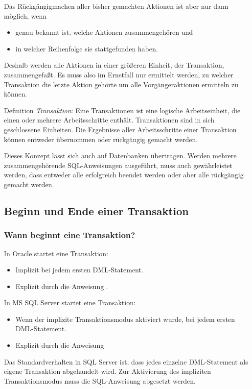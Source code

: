       Das R\"uckg\"angigmachen aller bisher gemachten Aktionen ist aber nur dann
      m\"oglich, wenn
      \begin{itemize}
        \item genau bekannt ist, welche Aktionen zusammengeh\"oren und
        \item  in welcher Reihenfolge sie stattgefunden haben.
      \end{itemize}
      Deshalb werden alle Aktionen in einer gr\"o\ss eren Einheit, der
      Transaktion, zusammengefa\ss t. Es muss also im Ernstfall nur ermittelt
      werden, zu welcher Transaktion die letzte Aktion geh\"orte um alle
      Vorg\"angeraktionen ermitteln zu k\"onnen.
      \begin{merke}
        Definition \textit{Transaktion}: Eine Transaktionen ist eine logische
        Arbeitseinheit, die einen oder mehrere Arbeitsschritte enth\"alt.
        Transaktionen sind in sich geschlossene Einheiten. Die Ergebnisse aller
        Arbeitsschritte einer Transaktion k\"onnen entweder \"ubernommen oder
        r\"uckg\"angig gemacht werden.
      \end{merke}
      Dieses Konzept l\"asst sich auch auf Datenbanken \"ubertragen. Werden
      mehrere zusammengeh\"orende SQL-Anweisungen ausgef\"uhrt, muss auch
      gew\"ahrleistet werden, dass entweder alle erfolgreich beendet werden oder
      aber alle r\"uckg\"angig gemacht werden.
      \subsection{Beginn und Ende einer Transaktion}
        \subsubsection{Wann beginnt eine Transaktion?}
          In Oracle startet eine Transaktion:
          \begin{itemize}
            \item Implizit bei jedem ersten DML-Statement.
            \item Explizit durch die Anweisung .
          \end{itemize}
          In MS SQL Server startet eine Transaktion:
          \begin{itemize}
            \item Wenn der implizite Transaktionsmodus aktiviert wurde, bei
            jedem ersten DML-State\-ment.
            \item Explizit durch die Anweisung 
          \end{itemize}
          \begin{merke}
            Das Standardverhalten in SQL Server ist, dass jedes einzelne
            DML-Statement als eigene Transaktion abgehandelt wird. Zur
            Ak\-ti\-vie\-rung des impliziten Transaktionsmodus muss die
            SQL-Anweisung  abgesetzt
            werden.
          \end{merke}
